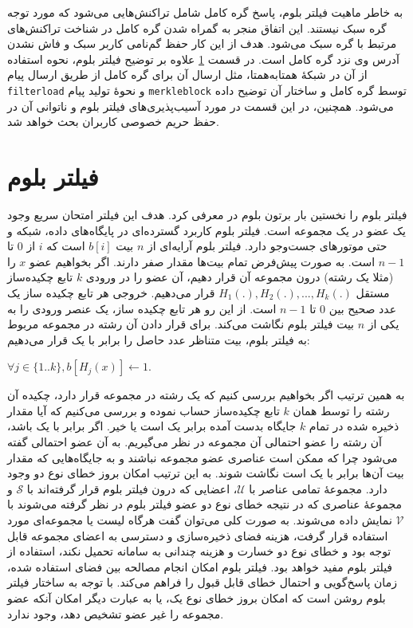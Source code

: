 به خاطر ماهیت فیلتر بلوم، پاسخ گره کامل  شامل تراکنش‌هایی می‌شود که مورد توجه گره سبک نیستند. این اتفاق منجر به گمراه شدن گره کامل در شناخت تراکنش‌های مرتبط با گره سبک می‌شود. هدف از این کار حفظ گم‌نامی کاربر سبک و فاش نشدن آدرس وی نزد گره کامل است. در قسمت \ref{BloomFilter} علاوه بر توضیح فیلتر بلوم، نحوه استفاده از آن در شبکهٔ همتابه‌همتا، مثل ارسال آن برای گره کامل  از طریق ارسال پیام \texttt{filterload} و نحوهٔ تولید پیام \texttt{merkleblock}  توسط گره کامل و ساختار آن توضیح داده می‌شود. همچنین، در این قسمت در مورد آسیب‌پذیری‌های فیلتر بلوم و ناتوانی آن در حفظ حریم خصوصی کاربران بحث خواهد شد.


\section{فیلتر بلوم}
\label{BloomFilter}
فیلتر بلوم را نخستین بار برتون بلوم در \cite{Bloom1970} معرفی کرد. هدف این فیلتر امتحان سریع وجود یک عضو در یک مجموعه است. فیلتر بلوم کاربرد گسترده‌ای در پایگاه‌های داده، شبکه و حتی موتور‌های جست‌وجو دارد. فیلتر بلوم آرایه‌ای از $n$ بیت $b[i]$ است که $i$ از $0$ تا$n-1$ است. به صورت پیش‌فرض تمام بیت‌ها مقدار صفر دارند. اگر بخواهیم عضو $x$ را (مثلا یک رشته) درون مجموعه آن قرار دهیم، آن عضو را در ورودی $k$ تابع چکیده‌ساز مستقل
$H_1(.), H_2(.), ..., H_k(.)$
قرار می‌دهیم. خروجی هر تابع چکیده ساز یک عدد صحیح بین $0$ تا $n-1$ است. از این رو هر تابع چکیده ساز، یک عنصر ورودی را به یکی از	 $n$ بیت فیلتر بلوم نگاشت می‌کند. برای قرار دادن آن رشته در مجموعه مربوط به فیلتر بلوم، بیت متناظر عدد حاصل را برابر با یک قرار می‌دهیم: 

$\forall j\in \{1..k\}, b[H_j(x)] \leftarrow 1$.

به همین ترتیب اگر بخواهیم بررسی کنیم که یک رشته در مجموعه قرار دارد، چکیده آن رشته را توسط همان $k$ تابع چکیده‌ساز حساب نموده و بررسی می‌کنیم که آیا مقدار ذخیره شده در تمام $k$ جایگاه بدست آمده برابر یک است یا خیر. اگر برابر با یک باشد، آن رشته را عضو احتمالی آن مجموعه در نظر می‌گیریم. به آن عضو احتمالی گفته می‌شود چرا که ممکن است عناصری عضو مجموعه نباشند و به جایگاه‌هایی که مقدار  بیت آن‌ها برابر با یک است نگاشت شوند. به این ترتیب امکان بروز خطای نوع دو وجود دارد. مجموعهٔ تمامی عناصر با $\mathcal{U}$، اعضایی که درون فیلتر بلوم قرار گرفته‌اند با $\mathcal{S}$ و مجموعهٔ عناصری که در نتیجه خطای نوع دو عضو فیلتر بلوم در نظر گرفته می‌شوند با $\mathcal{V}$ نمایش داده می‌شوند. به صورت کلی می‌توان گفت هرگاه لیست یا مجموعه‌ای مورد استفاده قرار گرفت، هزینه فضای ذخیره‌سازی و دسترسی به اعضای مجموعه قابل توجه بود و خطای نوع دو خسارت و هزینه چندانی به سامانه تحمیل نکند، استفاده از فیلتر بلوم مفید خواهد بود. فیلتر بلوم امکان انجام مصالحه بین فضای استفاده شده، زمان پاسخ‌گویی و احتمال خطای قابل قبول را فراهم می‌کند\cite{Bloom1970}. با توجه به ساختار فیلتر بلوم روشن است که امکان بروز خطای نوع یک، یا به عبارت دیگر امکان آنکه عضو مجموعه را غیر عضو تشخیص دهد، وجود ندارد.

